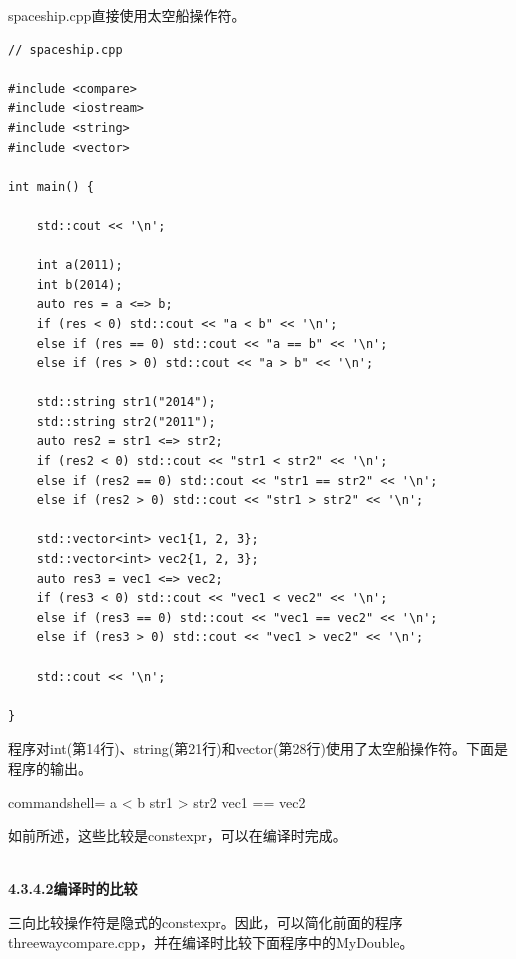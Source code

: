 spaceship.cpp直接使用太空船操作符。

\begin{lstlisting}[style=styleCXX]
// spaceship.cpp

#include <compare>
#include <iostream>
#include <string>
#include <vector>

int main() {
	
	std::cout << '\n';
	
	int a(2011);
	int b(2014);
	auto res = a <=> b;
	if (res < 0) std::cout << "a < b" << '\n';
	else if (res == 0) std::cout << "a == b" << '\n';
	else if (res > 0) std::cout << "a > b" << '\n';
	
	std::string str1("2014");
	std::string str2("2011");
	auto res2 = str1 <=> str2;
	if (res2 < 0) std::cout << "str1 < str2" << '\n';
	else if (res2 == 0) std::cout << "str1 == str2" << '\n';
	else if (res2 > 0) std::cout << "str1 > str2" << '\n';
	
	std::vector<int> vec1{1, 2, 3};
	std::vector<int> vec2{1, 2, 3};
	auto res3 = vec1 <=> vec2;
	if (res3 < 0) std::cout << "vec1 < vec2" << '\n';
	else if (res3 == 0) std::cout << "vec1 == vec2" << '\n';
	else if (res3 > 0) std::cout << "vec1 > vec2" << '\n';
	
	std::cout << '\n';

}
\end{lstlisting}

程序对int(第14行)、string(第21行)和vector(第28行)使用了太空船操作符。下面是程序的输出。

\begin{tcblisting}{commandshell={}}
a < b
str1 > str2
vec1 == vec2
\end{tcblisting}

如前所述，这些比较是constexpr，可以在编译时完成。

\hspace*{\fill} \\ %
\noindent
\textbf{4.3.4.2\hspace{0.2cm}编译时的比较}

三向比较操作符是隐式的constexpr。因此，可以简化前面的程序threewaycompare.cpp，并在编译时比较下面程序中的MyDouble。

